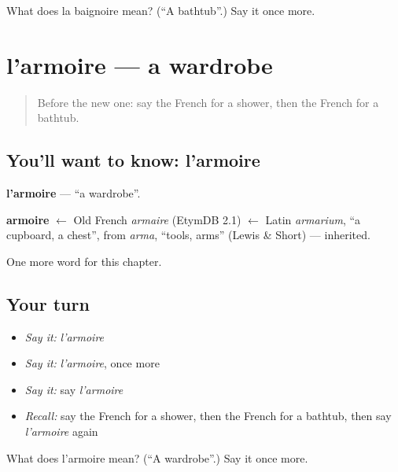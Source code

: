 \begin{tcolorbox}[breakable,colback=teal!4,colframe=teal!35!black,title={Before you move on}]
What does la baignoire mean? (\textquotedblleft{}A bathtub\textquotedblright{}.) Say it once more.
\end{tcolorbox}
\section[l'armoire]{l'armoire — a wardrobe}

\label{lesson:FR-C112-armoire}



\begin{quote}
Before the new one: say the French for a shower, then the French for a bathtub.
\end{quote}

\subsection*{You'll want to know: l'armoire}
\textbf{l'armoire} — \textquotedblleft{}a wardrobe\textquotedblright{}.

\begin{cousinweb}
\textbf{armoire} $\leftarrow$ Old French \emph{armaire} (EtymDB 2.1) $\leftarrow$ Latin \emph{armarium}, \textquotedblleft{}a cupboard, a chest\textquotedblright{}, from \emph{arma}, \textquotedblleft{}tools, arms\textquotedblright{} (Lewis \& Short) — inherited.
\end{cousinweb}

\begin{grammarlens}[title={What you've built}]
One more word for this chapter.
\end{grammarlens}

\subsection*{Your turn}
\begin{itemize}
\raggedright
  \item \emph{Say it:} \emph{l'armoire}
  \item \emph{Say it:} \emph{l'armoire}, once more
  \item \emph{Say it:} say \emph{l'armoire}
  \item \emph{Recall:} say the French for a shower, then the French for a bathtub, then say \emph{l'armoire} again
\end{itemize}

\begin{tcolorbox}[breakable,colback=teal!4,colframe=teal!35!black,title={Before you move on}]
What does l'armoire mean? (\textquotedblleft{}A wardrobe\textquotedblright{}.) Say it once more.
\end{tcolorbox}
